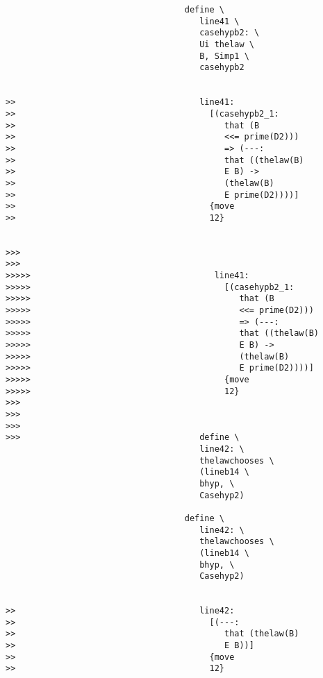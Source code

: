 \documentclass[12pt]{article}
\begin{document}
\begin{verbatim}
                                    define \
                                       line41 \
                                       casehypb2: \
                                       Ui thelaw \
                                       B, Simp1 \
                                       casehypb2


>>                                     line41:
>>                                       [(casehypb2_1:
>>                                          that (B
>>                                          <<= prime(D2)))
>>                                          => (---:
>>                                          that ((thelaw(B)
>>                                          E B) ->
>>                                          (thelaw(B)
>>                                          E prime(D2))))]
>>                                       {move
>>                                       12}


>>>
>>>
>>>>>                                     line41:
>>>>>                                       [(casehypb2_1:
>>>>>                                          that (B
>>>>>                                          <<= prime(D2)))
>>>>>                                          => (---:
>>>>>                                          that ((thelaw(B)
>>>>>                                          E B) ->
>>>>>                                          (thelaw(B)
>>>>>                                          E prime(D2))))]
>>>>>                                       {move
>>>>>                                       12}
>>>
>>>
>>>
>>>                                    define \
                                       line42: \
                                       thelawchooses \
                                       (lineb14 \
                                       bhyp, \
                                       Casehyp2)

                                    define \
                                       line42: \
                                       thelawchooses \
                                       (lineb14 \
                                       bhyp, \
                                       Casehyp2)


>>                                     line42:
>>                                       [(---:
>>                                          that (thelaw(B)
>>                                          E B))]
>>                                       {move
>>                                       12}



\end{verbatim}
\end{document}
